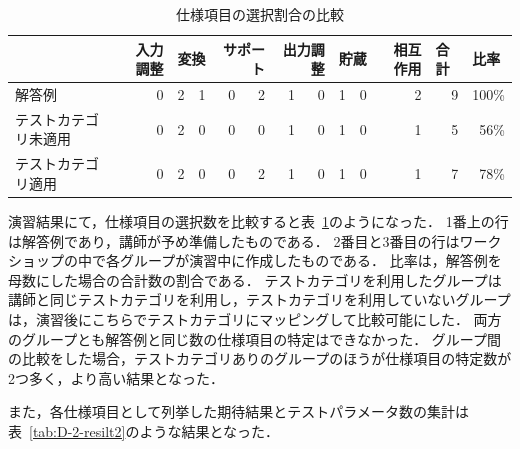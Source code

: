 \begin{table}[htbp]
  \centering
  \caption{仕様項目の選択割合の比較}
    \begin{tabular}{|l|r|r|r|r|r|r|r|r|r|r|r|r|}
    \hline
          & \multicolumn{1}{p{2em}|}{入力調整} & \multicolumn{2}{c|}{変換} & \multicolumn{2}{p{4em}|}{サポート} & \multicolumn{2}{p{2em}|}{出力調整} & \multicolumn{2}{c|}{貯蔵} & \multicolumn{1}{p{2em}|}{相互作用} & \multicolumn{1}{l|}{合計} & \multicolumn{1}{l|}{比率} \bigstrut\\
    \hline
    \hline
    解答例   & 0     & 2     & 1     & 0     & 2     & 1     & 0     & 1     & 0     & 2     & 9     & 100\% \bigstrut\\
    \cline{1-13}
    \multicolumn{1}{|p{7em}|}{テストカテゴリ未適用}  & 0     & 2     & 0     & 0     & 0     & 1     & 0     & 1     & 0     & 1     & 5     & 56\% \bigstrut\\
    \cline{1-13}
    \multicolumn{1}{|p{7em}|}{テストカテゴリ適用}  & 0     & 2     & 0     & 0     & 2     & 1     & 0     & 1     & 0     & 1     & 7     & 78\% \bigstrut\\
    \hline
    \end{tabular}%
  \label{tab:D-2-SICompare}%
\end{table}%

演習結果にて，仕様項目の選択数を比較すると表~\ref{tab:D-2-SICompare}のようになった．
1番上の行は解答例であり，講師が予め準備したものである．
2番目と3番目の行はワークショップの中で各グループが演習中に作成したものである．
比率は，解答例を母数にした場合の合計数の割合である．
テストカテゴリを利用したグループは講師と同じテストカテゴリを利用し，テストカテゴリを利用していないグループは，演習後にこちらでテストカテゴリにマッピングして比較可能にした．
両方のグループとも解答例と同じ数の仕様項目の特定はできなかった．
グループ間の比較をした場合，テストカテゴリありのグループのほうが仕様項目の特定数が2つ多く，より高い結果となった．

また，各仕様項目として列挙した期待結果とテストパラメータ数の集計は表~\ref{tab:D-2-resilt2}のような結果となった．

